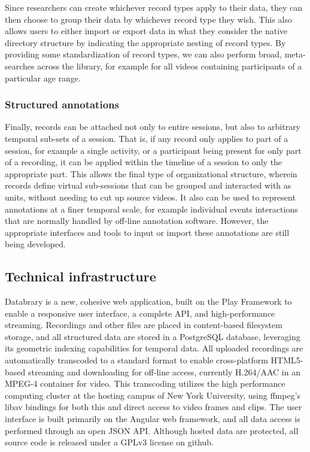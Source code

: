 \documentclass{sig-alternate}
\begin{document}
Since researchers can create whichever record types apply to their data, they can then choose to group their data by whichever record type they wish.
This also allows users to either import or export data in what they consider the native directory structure by indicating the appropriate nesting of record types.
By providing some standardization of record types, we can also perform broad, meta-searches across the library, for example for all videos containing participants of a particular age range.

\subsubsection*{Structured annotations}

Finally, records can be attached not only to entire sessions, but also to arbitrary temporal sub-sets of a session.
That is, if any record only applies to part of a session, for example a single activity, or a participant being present for only part of a recording, it can be applied within the timeline of a session to only the appropriate part.
This allows the final type of organizational structure, wherein records define virtual sub-sessions that can be grouped and interacted with as units, without needing to cut up source videos.
It also can be used to represent annotations at a finer temporal scale, for example individual events interactions that are normally handled by off-line annotation software.
However, the appropriate interfaces and tools to input or import these annotations are still being developed.

\subsection{Technical infrastructure}

Databrary is a new, cohesive web application, built on the Play Framework to enable a responsive user interface, a complete API, and high-performance streaming.
Recordings and other files are placed in content-based filesystem storage, and all structured data are stored in a PostgreSQL database, leveraging its geometric indexing capabilities for temporal data.
All uploaded recordings are automatically transcoded to a standard format to enable cross-platform HTML5-based streaming and downloading for off-line access, currently H.264/AAC in an MPEG-4 container for video.
This transcoding utilizes the high performance computing cluster at the hosting campus of New York University, using ffmpeg's libav bindings for both this and direct access to video frames and clips.
The user interface is built primarily on the Angular web framework, and all data access is performed through an open JSON API.
Although hosted data are protected, all source code is released under a GPLv3 license on github.
\end{document}
